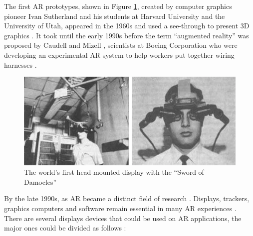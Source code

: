 The first AR prototypes, shown in Figure \ref{figure:first_head_mount}, created by computer graphics pioneer Ivan Sutherland and his students at Harvard University and the University of Utah, appeared in the 1960s and used a see-through to present 3D graphics \cite{Benford1998}. It took until the early 1990s before the term ``augmented reality'' was proposed by Caudell and Mizell \cite{Benford1998}, scientists at Boeing Corporation who were developing an experimental AR system to help workers put together wiring harnesses \cite{Benford1998}.

\begin{figure}[!htb]
  \centering
  \includegraphics[width=380pt]{chapters/basic_concepts/first_head_mount.png}
  \caption{The world's first head-mounted display with the ``Sword of Damocles''}
  \label{figure:first_head_mount}
\end{figure}

By the late 1990s, as AR became a distinct field of research \cite{Krevelen2010}. Displays, trackers, graphics computers and software remain essential in many AR experiences \cite{Krevelen2010,Benford1998}. There are several displays devices that could be used on AR applications, the major ones could be divided as follows \cite{Benford1998}:

